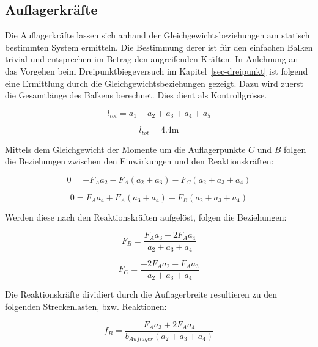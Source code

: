 \documentclass[
  12pt,
  letterpaper,
  egregdoesnotlikesansseriftitles]{scrreprt}
\begin{document}
\subsection{Auflagerkräfte}\label{auflagerkruxe4fte-1}

Die Auflagerkräfte lassen sich anhand der Gleichgewichtsbeziehungen am
statisch bestimmten System ermitteln. Die Bestimmung derer ist für den
einfachen Balken trivial und entsprechen im Betrag den angreifenden
Kräften. In Anlehnung an das Vorgehen beim Dreipunktbiegeversuch im
Kapitel~\ref{sec-dreipunkt} ist folgend eine Ermittlung durch die
Gleichgewichtsbeziehungen gezeigt. Dazu wird zuerst die Gesamtlänge des
Balkens berechnet. Dies dient als Kontrollgrösse.

\begin{equation}l_{tot} = a_{1} + a_{2} + a_{3} + a_{4} + a_{5}\end{equation}

\begin{equation}l_{tot} = 4.4 \text{m}\end{equation}

Mittels dem Gleichgewicht der Momente um die Auflagerpunkte \(C\) und
\(B\) folgen die Beziehungen zwischen den Einwirkungen und den
Reaktionskräften:

\begin{equation}0 = - F_{A} a_{2} - F_{A} \left(a_{2} + a_{3}\right) - F_{C} \left(a_{2} + a_{3} + a_{4}\right)\end{equation}

\begin{equation}0 = F_{A} a_{4} + F_{A} \left(a_{3} + a_{4}\right) - F_{B} \left(a_{2} + a_{3} + a_{4}\right)\end{equation}

Werden diese nach den Reaktionskräften aufgelöst, folgen die
Beziehungen:

\begin{equation}F_{B} = \frac{F_{A} a_{3} + 2 F_{A} a_{4}}{a_{2} + a_{3} + a_{4}}\end{equation}

\begin{equation}F_{C} = \frac{- 2 F_{A} a_{2} - F_{A} a_{3}}{a_{2} + a_{3} + a_{4}}\end{equation}

Die Reaktionskräfte dividiert durch die Auflagerbreite resultieren zu
den folgenden Streckenlasten, bzw. Reaktionen:

\begin{equation}f_{B} = \frac{F_{A} a_{3} + 2 F_{A} a_{4}}{b_{Auflager} \left(a_{2} + a_{3} + a_{4}\right)}\end{equation}
\end{document}
